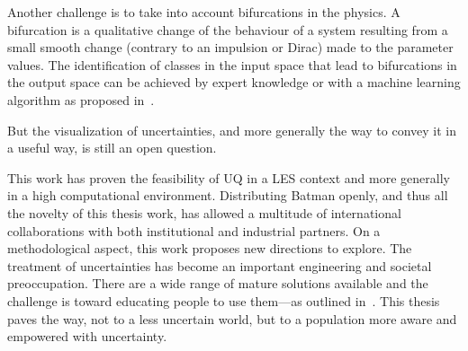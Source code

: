 Another challenge is to take into account bifurcations in the physics. A bifurcation is a qualitative change of the behaviour of a system resulting from a small smooth change (contrary to an impulsion or Dirac) made to the parameter values. The identification of classes in the input space that lead to bifurcations in the output space can be achieved by expert knowledge or with a machine learning algorithm as proposed in~\cite{Dupuis2018}.

But the visualization of uncertainties, and more generally the way to convey it in a useful way, is still an open question.



This work has proven the feasibility of UQ in a LES context and more generally in a high computational environment. Distributing Batman openly, and thus all the novelty of this thesis work, has allowed a multitude of international collaborations with both institutional and industrial partners. On a methodological aspect, this work proposes new directions to explore. The treatment of uncertainties has become an important engineering and societal preoccupation. There are a wide range of mature solutions available and the challenge is toward educating people to use them---as outlined in~\cite{Saltelli2019}. This thesis paves the way, not to a less uncertain world, but to a population more aware and empowered with uncertainty.








